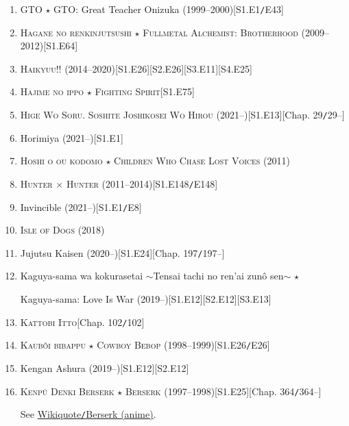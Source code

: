 \documentclass[oneside]{book}
\numberwithin{equation}{section}
\begin{document}
\begin{enumerate}
    \item GTO $\star$ GTO: Great Teacher Onizuka (1999--2000)\hfill[S1.E1\texttt{/}E43]
    \item \textsc{Hagane no renkinjutsushi $\star$ Fullmetal Alchemist: Brotherhood} (2009--2012)\hfill[S1.E64]
    \item \textsc{Haikyuu!!} (2014--2020)\hfill[S1.E26][S2.E26][S3.E11][S4.E25]
    \item \textsc{Hajime no ippo $\star$ Fighting Spirit}\hfill[S1.E75]
    \item \textsc{Hige Wo Soru. Soshite Joshikosei Wo Hirou} (2021--)\hfill[S1.E13][Chap. 29\texttt{/}29--]
    \item Horimiya (2021--)\hfill[S1.E1]
    \item \textsc{Hoshi o ou kodomo $\star$ Children Who Chase Lost Voices} (2011)
    \item \textsc{Hunter $\times$ Hunter} (2011--2014)\hfill[S1.E148\texttt{/}E148]
    \item Invincible (2021--)\hfill[S1.E1\texttt{/}E8]
    \item \textsc{Isle of Dogs} (2018)
    \item Jujutsu Kaisen (2020--)\hfill[S1.E24][Chap. 197\texttt{/}197--]
    \item Kaguya-sama wa kokurasetai $\sim$Tensai tachi no ren'ai zun\^o sen$\sim$ $\star$
    
    Kaguya-sama: Love Is War (2019--)\hfill[S1.E12][S2.E12][S3.E13]
    \item \textsc{Kattobi Itto}\hfill[Chap. 102\texttt{/}102]
    \item \textsc{Kaub\^oi bibappu $\star$ Cowboy Bebop} (1998--1999)\hfill[S1.E26\texttt{/}E26]
    \item Kengan Ashura (2019--)\hfill[S1.E12][S2.E12]
    \item \textsc{Kenp\^u Denki Berserk $\star$ Berserk} (1997--1998)\hfill[S1.E25][Chap. 364\texttt{/}364--]
    
    See \href{https://en.wikiquote.org/wiki/Berserk_(anime)}{Wikiquote\texttt{/}Berserk (anime)}.
    

\end{enumerate}
\end{document}
